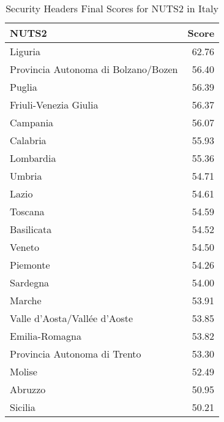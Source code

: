 
    \begin{table}[ht]
        \centering
        \caption{Security Headers Final Scores for NUTS2 in Italy}
        \label{tab:final_grades_sh_it}
        \begin{tabular}{lr}
            \toprule
            \textbf{NUTS2} & \textbf{Score} \\
            \midrule
            Liguria & 62.76 \\
            Provincia Autonoma di Bolzano/Bozen & 56.40 \\
            Puglia & 56.39 \\
            Friuli-Venezia Giulia & 56.37 \\
            Campania & 56.07 \\
            Calabria & 55.93 \\
            Lombardia & 55.36 \\
            Umbria & 54.71 \\
            Lazio & 54.61 \\
            Toscana & 54.59 \\
            Basilicata & 54.52 \\
            Veneto & 54.50 \\
            Piemonte & 54.26 \\
            Sardegna & 54.00 \\
            Marche & 53.91 \\
            Valle d’Aosta/Vallée d’Aoste & 53.85 \\
            Emilia-Romagna & 53.82 \\
            Provincia Autonoma di Trento & 53.30 \\
            Molise & 52.49 \\
            Abruzzo & 50.95 \\
            Sicilia & 50.21 \\
            \bottomrule
        \end{tabular}
    \end{table}
    